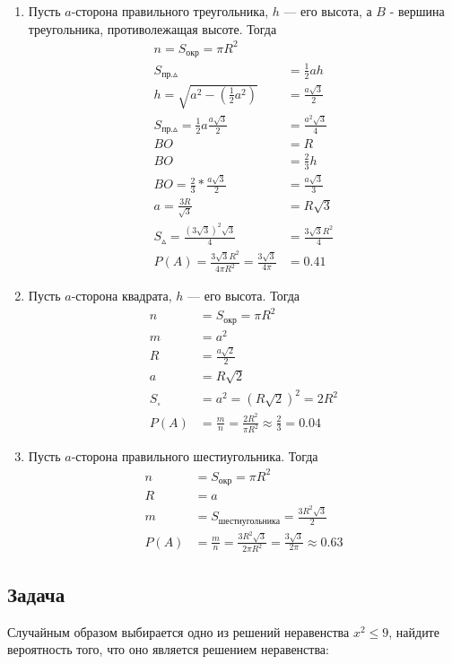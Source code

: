 \documentclass[a4paper,12pt]{article}
\begin{document}
\begin{enumerate}
	\item { Пусть $a$-сторона правильного треугольника, $h$ --- его высота, а $B$ - вершина треугольника, противолежащая высоте. Тогда
		\begin{align*}
			n=S_{\text{окр}}=\pi{}R^2\\
			S_{\text{пр.}\vartriangle}&=\frac{1}{2}ah\\
			h=\sqrt{a^2-(\frac{1}{2}a^2)}&=\frac{a\sqrt{3}}{2}\\
			S_{\text{пр.}\vartriangle}=\frac{1}{2}a\frac{a\sqrt{3}}{2}&=\frac{a^2\sqrt{3}}{4}\\
			BO&=R\\
			BO&=\frac{2}{3}h\\
			BO=\frac{2}{3}*\frac{a\sqrt{3}}{2}&=\frac{a\sqrt{3}}{3}\\
			a=\frac{3R}{\sqrt{3}}&=R\sqrt{3}\\
			S_{\vartriangle}=\frac{(3\sqrt{3})^2\sqrt{3}}{4}&=\frac{3\sqrt{3}R^2}{4}\\
			P(A)=\frac{3\sqrt{3}R^2}{4\pi{}R^2}=\frac{3\sqrt{3}}{4\pi}&=0.41
		\end{align*}
	}
	\item { Пусть $a$-сторона квадрата, $h$ --- его высота. Тогда
		\begin{align*}
			n&=S_{\text{окр}}=\pi{}R^2\\
			m&=a^2\\
			R&=\frac{a\sqrt{2}}{2}\\
			a&=R\sqrt{2}\\
			S_\square&=a^2=(R\sqrt{2})^2=2R^2\\
			P(A)&=\frac{m}{n}=\frac{2R^2}{\pi{}R^2}\approx\frac{2}{3}=0.04
		\end{align*}
	}	
	\item { Пусть $a$-сторона правильного шестиугольника. Тогда
		\begin{align*}			
			n&=S_{\text{окр}}=\pi{}R^2\\
			R&=a\\
			m&=S_{\text{шестиугольника}}=\frac{3R^2\sqrt{3}}{2}\\
			P(A)&=\frac{m}{n}=\frac{3R^2\sqrt{3}}{2\pi{}R^2}=\frac{3\sqrt{3}}{2\pi}\approx0.63
		\end{align*}
	}		
\end{enumerate}

\subsection{Задача}
Случайным образом выбирается одно из решений неравенства $x^2\leq9$, найдите вероятность того, что оно является решением неравенства:
\end{document}
